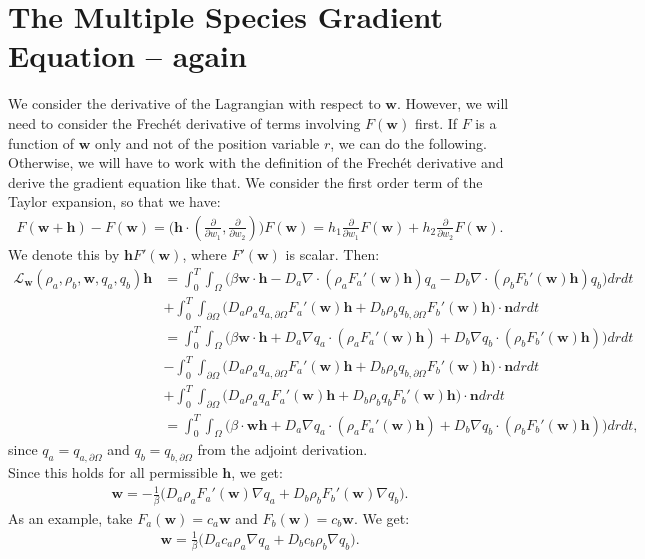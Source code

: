 \documentclass[11pt, a4paper]{article}
\theoremstyle{definition}
\newcommand{\adja}{q_a}
\newcommand{\adjb}{q_b}
\newcommand{\adjaB}{q_{a,\partial \Omega}}
\newcommand{\adjbB}{q_{b,\partial \Omega}}
\newcommand{\ra}{\rho_a}
\newcommand{\rb}{\rho_b}
\newcommand{\w}{\mathbf{w}}
\newcommand{\n}{\mathbf{n}}
\newcommand{\h}{\mathbf{h}}
\begin{document}
	
	
\section{The Multiple Species Gradient Equation -- again}
We consider the derivative of the Lagrangian with respect to $\w$. However, we will need to consider the Frech\'et derivative of terms involving $F(\w)$ first. If $F$ is a function of $\w$ only and not of the position variable $r$, we can do the following. Otherwise, we will have to work with the definition of the Frech\'et derivative and derive the gradient equation like that.
We consider the first order term of the Taylor expansion, so that we have:
\begin{align*}
F(\w + \h) - F(\w) =  \bigg(\h \cdot \left(\frac{\partial}{\partial w_1}, \frac{\partial}{\partial w_2}\right)\bigg) F(\w) = h_1 \frac{\partial}{\partial w_1} F(\w)  + h_2\frac{\partial}{\partial w_2} F(\w) . 
\end{align*}
We denote this by $\h F'(\w)$, where $F'(\w)$ is scalar.
Then:
\begin{align*}
\mathcal{L}_{\w}(\ra,\rb, \w, \adja, \adjb) \h  &= \int_0^T \int_\Omega \bigg( \beta \w \cdot \h - D_a \nabla \cdot (\ra F_a'(\w)\h)  \adja - D_b \nabla \cdot (\rb F_b'(\w)\h) \adjb \bigg)dr dt \\
&+ \int_0^T \int_{\partial \Omega} \bigg( D_a \ra \adjaB F_a'(\w)\h  + D_b \rb \adjbB F_b'(\w)\h     \bigg) \cdot \n dr dt\\
&= \int_0^T \int_\Omega \bigg( \beta \w \cdot \h + D_a \nabla  \adja \cdot (\ra F_a'(\w) \h) 
+ D_b \nabla \adjb \cdot (\rb F_b'(\w) \h) \bigg)dr dt \\
&- \int_0^T \int_{\partial \Omega} \bigg( D_a \ra \adjaB F_a'(\w)\h  + D_b \rb \adjbB F_b'(\w)\h     \bigg) \cdot \n dr dt\\
&+\int_0^T \int_{\partial \Omega} \bigg( D_a \ra \adja F_a'(\w)\h  + D_b \rb \adjb F_b'(\w) \h     \bigg) \cdot \n dr dt\\
&= \int_0^T \int_\Omega \bigg( \beta \cdot \w \h + D_a \nabla  \adja \cdot (\ra F_a'(\w) \h) 
+ D_b \nabla \adjb \cdot (\rb F_b'(\w)\h) \bigg)dr dt,
\end{align*}
since $\adja = \adjaB$ and $\adjb = \adjbB$ from the adjoint derivation.\\
Since this holds for all permissible $\h$, we get:
\begin{align*}
\w  = - \frac{1}{\beta} \bigg( D_a  \ra F_a'(\w)\nabla  \adja 
+ D_b  \rb F_b'(\w) \nabla \adjb\bigg).
\end{align*} 
As an example, take $F_a(\w) = c_a \w$ and $F_b(\w) = c_b \w$. We get:
\begin{align*}
\w  = \frac{1}{\beta}\bigg( D_a c_a  \ra  \nabla \adja + D_b c_b \rb \nabla \adjb \bigg).
\end{align*}	
	
\end{document}
